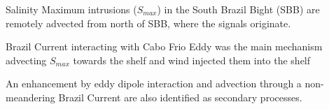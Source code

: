 \documentclass[draft]{agujournal2019}
\begin{document}








\begin{keypoints}
\item Salinity Maximum intrusions (\textit{$S_{max}$}) in the South Brazil Bight (SBB) are remotely advected from north of SBB, where the signals originate.
\item Brazil Current interacting with Cabo Frio Eddy was the main mechanism advecting \textit{$S_{max}$} towards the shelf and wind injected them into the shelf
\item An enhancement by eddy dipole interaction and advection through a non-meandering Brazil Current are also identified as secondary processes.
\end{keypoints}

%
%
\end{document}
